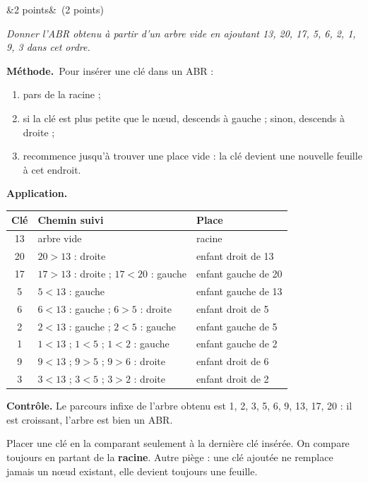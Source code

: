 \documentclass[11pt, a4paper]{exam}
\newcommand{\Q}[3]{\par\needspace{5\baselineskip}\bigskip\noindent{\large\bfseries Question #1}\ifx&#2&\else\ \textnormal{(#2)}\fi\par\nopagebreak\smallskip\noindent\textit{#3}\par\nopagebreak\smallskip}
\newcommand{\methode}{\par\noindent\textbf{Méthode.}\ }
\newcommand{\application}{\par\noindent\textbf{Application.}\ }
\begin{document}
\Q{3}{2 points}{Donner l'ABR obtenu à partir d'un arbre vide en ajoutant 13, 20, 17, 5, 6, 2, 1, 9, 3 dans cet ordre.}
\begin{reponse}
\begin{center}
\end{center}
\end{reponse}
\methode Pour insérer une clé dans un ABR :
\begin{enumerate}
\item pars de la racine ;
\item si la clé est plus petite que le nœud, descends à gauche ; sinon, descends à droite ;
\item recommence jusqu'à trouver une place vide : la clé devient une nouvelle feuille à cet endroit.
\end{enumerate}
\application
\begin{center}
\renewcommand{\arraystretch}{1.2}
\begin{tabular}{|c|l|l|}
\hline
\textbf{Clé} & \textbf{Chemin suivi} & \textbf{Place} \\ \hline
13 & arbre vide & racine \\
20 & $20 > 13$ : droite & enfant droit de 13 \\
17 & $17 > 13$ : droite ; $17 < 20$ : gauche & enfant gauche de 20 \\
5 & $5 < 13$ : gauche & enfant gauche de 13 \\
6 & $6 < 13$ : gauche ; $6 > 5$ : droite & enfant droit de 5 \\
2 & $2 < 13$ : gauche ; $2 < 5$ : gauche & enfant gauche de 5 \\
1 & $1 < 13$ ; $1 < 5$ ; $1 < 2$ : gauche & enfant gauche de 2 \\
9 & $9 < 13$ ; $9 > 5$ ; $9 > 6$ : droite & enfant droit de 6 \\
3 & $3 < 13$ ; $3 < 5$ ; $3 > 2$ : droite & enfant droit de 2 \\ \hline
\end{tabular}
\end{center}
\textbf{Contrôle.} Le parcours infixe de l'arbre obtenu est 1, 2, 3, 5, 6, 9, 13, 17, 20 : il est croissant, l'arbre est bien un ABR.
\begin{erreur}
Placer une clé en la comparant seulement à la dernière clé insérée. On compare toujours en partant de la \textbf{racine}. Autre piège : une clé ajoutée ne remplace jamais un nœud existant, elle devient toujours une feuille.
\end{erreur}
\end{document}
